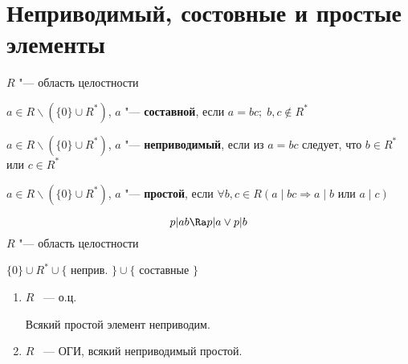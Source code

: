 \section{Неприводимый, состовные и простые элементы}
$R$ "--- область целостности 
\begin{Def}
	$a \in R \smallsetminus \left(\{0\} \cup R^{*}\right)$, $a$ "--- \textbf{составной}, если $a = bc; \; b, c \notin R^{*}$
\end{Def}

\begin{Def}
	$a \in R \smallsetminus \left(\{0\} \cup R^{*}\right)$, $a$ "--- \textbf{неприводимый}, если из $a = bc$ следует, что 
	$b \in R^{*}$ или $c \in R^{*}$
\end{Def}

\begin{Def}
	$a \in R \smallsetminus \left(\{0\} \cup R^{*}\right)$, $a$ "--- \textbf{простой}, если $\forall b, c \in R 
	\left(a \mid bc \Rightarrow a \mid b \text{ или } a \mid c \right)$ 
\end{Def}

$$p|ab \Ra p|a \vee p|b$$
$R$ "--- область целостности

$\{0\}\cup R^{*} \cup \{$ неприв. $\} \cup \{$ составные $\}$

\begin{theorem}{}
\begin{enumerate}
    \item $R$ ~--- о.ц.

    Всякий простой элемент неприводим.
    \item $R$ ~--- ОГИ, всякий неприводимый простой. 
\end{enumerate}
\end{theorem}

